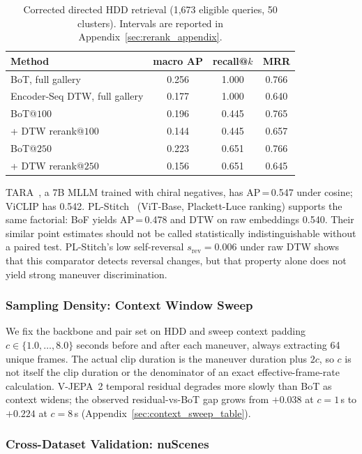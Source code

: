 \documentclass{article}
\theoremstyle{remark}
\begin{document}
\begin{table}[ht]
\centering
\caption{Corrected directed HDD retrieval (1{,}673 eligible queries, 50 clusters). Intervals are reported in Appendix~\ref{sec:rerank_appendix}.}
\label{tab:rerank_hdd}
\begin{tabular}{lccc}
\toprule
\textbf{Method} & \textbf{macro AP} & \textbf{recall@$k$} & \textbf{MRR} \\
\midrule
BoT, full gallery & 0.256 & 1.000 & 0.766 \\
Encoder-Seq DTW, full gallery & 0.177 & 1.000 & 0.640 \\
BoT@$100$ & 0.196 & 0.445 & 0.765 \\
\; + DTW rerank@$100$ & 0.144 & 0.445 & 0.657 \\
BoT@$250$ & 0.223 & 0.651 & 0.766 \\
\; + DTW rerank@$250$ & 0.156 & 0.651 & 0.645 \\
\bottomrule
\end{tabular}
\end{table}

TARA~\cite{tara}, a 7B MLLM trained with chiral negatives, has AP\,=\,0.547 under cosine; ViCLIP has 0.542. PL-Stitch~\cite{plstitch} (ViT-Base, Plackett-Luce ranking) supports the same factorial: BoF yields AP\,=\,0.478 and DTW on raw embeddings 0.540. Their similar point estimates should not be called statistically indistinguishable without a paired test. PL-Stitch's low self-reversal $s_\text{rev}\!=\!0.006$ under raw DTW shows that this comparator detects reversal changes, but that property alone does not yield strong maneuver discrimination.

\subsubsection{Sampling Density: Context Window Sweep}
\label{sec:context_sweep}

We fix the backbone and pair set on HDD and sweep context padding $c \in \{1.0, \ldots, 8.0\}$ seconds before and after each maneuver, always extracting 64 unique frames. The actual clip duration is the maneuver duration plus $2c$, so $c$ is not itself the clip duration or the denominator of an exact effective-frame-rate calculation. V-JEPA~2 temporal residual degrades more slowly than BoT as context widens; the observed residual-vs-BoT gap grows from $+0.038$ at $c\!=\!1$\,s to $+0.224$ at $c\!=\!8$\,s (Appendix~\ref{sec:context_sweep_table}).

\subsubsection{Cross-Dataset Validation: nuScenes}
\label{sec:nuscenes}
\end{document}
